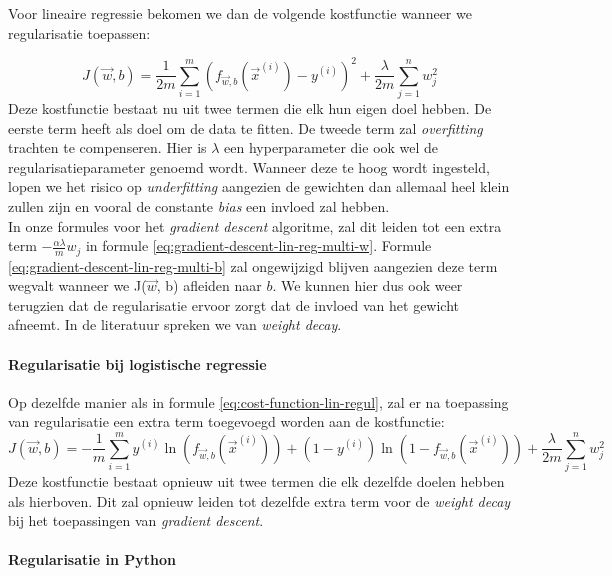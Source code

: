 Voor lineaire regressie bekomen we dan de volgende kostfunctie wanneer we regularisatie toepassen:

\begin{equation}
	J(\vec{w}, b) = \frac{1}{2m} \sum_{i=1}^{m} (f_{\vec{w},b}(\vec{x}^{(i)}) - y^{(i)})^{2} + \frac{\lambda}{2m} \sum_{j=1}^{n} w_{j}^{2}
	\label{eq:cost-function-lin-regul}
\end{equation}
\noindent
Deze kostfunctie bestaat nu uit twee termen die elk hun eigen doel hebben. De eerste term heeft als doel om de data te fitten. De tweede term zal \textit{overfitting} trachten te compenseren. Hier is $\lambda$ een hyperparameter die ook wel de regularisatieparameter genoemd wordt. Wanneer deze te hoog wordt ingesteld, lopen we het risico op \textit{underfitting} aangezien de gewichten dan allemaal heel klein zullen zijn en vooral de constante \textit{bias} een invloed zal hebben. \\
\newline
In onze formules voor het \textit{gradient descent} algoritme, zal dit leiden tot een extra term $-\frac{\alpha \lambda}{m} w_{j}$ in formule \ref{eq:gradient-descent-lin-reg-multi-w}. Formule \ref{eq:gradient-descent-lin-reg-multi-b} zal ongewijzigd blijven aangezien deze term wegvalt wanneer we J($\vec{w}$, b) afleiden naar $b$. We kunnen hier dus ook weer terugzien dat de regularisatie ervoor zorgt dat de invloed van het gewicht afneemt. In de literatuur spreken we van \textit{weight decay}. 

\paragraph{Regularisatie bij logistische regressie}

Op dezelfde manier als in formule \ref{eq:cost-function-lin-regul}, zal er na toepassing van regularisatie een extra term toegevoegd worden aan de kostfunctie:
\begin{equation}
	J(\vec{w}, b) = -\frac{1}{m} \sum_{i=1}^{m} y^{(i)}\ln(f_{\vec{w},b}(\vec{x}^{(i)})) + (1 - y^{(i)}) \ln(1 - f_{\vec{w},b}(\vec{x}^{(i)})) + \frac{\lambda}{2m} \sum_{j=1}^{n} w_{j}^{2}
\end{equation}
\noindent
Deze kostfunctie bestaat opnieuw uit twee termen die elk dezelfde doelen hebben als hierboven. Dit zal opnieuw leiden tot dezelfde extra term voor de \textit{weight decay} bij het toepassingen van \textit{gradient descent}.

\paragraph{Regularisatie in Python}

